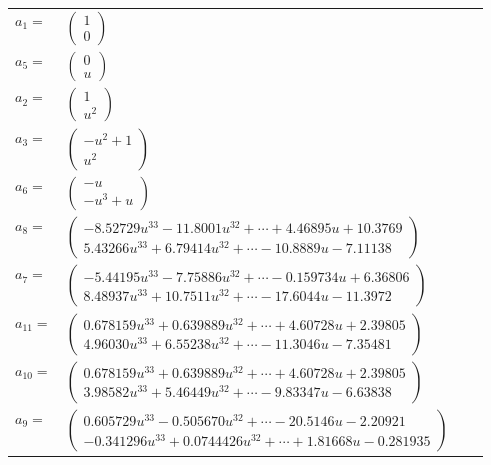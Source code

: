 \documentclass[1p]{elsarticle_modified}
\theoremstyle{definition}
\begin{document}
\begin{tabular}{m{7pt} m{180pt} m{7pt} m{180pt} }
\flushright $a_{1}=$&$\begin{pmatrix}1\\0\end{pmatrix}$ \\
\flushright $a_{5}=$&$\begin{pmatrix}0\\u\end{pmatrix}$ \\
\flushright $a_{2}=$&$\begin{pmatrix}1\\u^2\end{pmatrix}$ \\
\flushright $a_{3}=$&$\begin{pmatrix}- u^2+1\\u^2\end{pmatrix}$ \\
\flushright $a_{6}=$&$\begin{pmatrix}- u\\- u^3+u\end{pmatrix}$ \\
\flushright $a_{8}=$&$\begin{pmatrix}-8.52729 u^{33}-11.8001 u^{32}+\cdots+4.46895 u+10.3769\\5.43266 u^{33}+6.79414 u^{32}+\cdots-10.8889 u-7.11138\end{pmatrix}$ \\
\flushright $a_{7}=$&$\begin{pmatrix}-5.44195 u^{33}-7.75886 u^{32}+\cdots-0.159734 u+6.36806\\8.48937 u^{33}+10.7511 u^{32}+\cdots-17.6044 u-11.3972\end{pmatrix}$ \\
\flushright $a_{11}=$&$\begin{pmatrix}0.678159 u^{33}+0.639889 u^{32}+\cdots+4.60728 u+2.39805\\4.96030 u^{33}+6.55238 u^{32}+\cdots-11.3046 u-7.35481\end{pmatrix}$ \\
\flushright $a_{10}=$&$\begin{pmatrix}0.678159 u^{33}+0.639889 u^{32}+\cdots+4.60728 u+2.39805\\3.98582 u^{33}+5.46449 u^{32}+\cdots-9.83347 u-6.63838\end{pmatrix}$ \\
\flushright $a_{9}=$&$\begin{pmatrix}0.605729 u^{33}-0.505670 u^{32}+\cdots-20.5146 u-2.20921\\-0.341296 u^{33}+0.0744426 u^{32}+\cdots+1.81668 u-0.281935\end{pmatrix}$ \\

\end{tabular}
\end{document}
